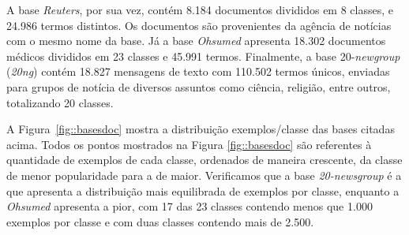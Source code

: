 A base \textit{Reuters}, por sua vez, contém 8.184 documentos divididos em 8 classes, e 24.986 termos distintos. Os documentos são provenientes da agência de notícias com o mesmo nome da base.
Já a base \textit{Ohsumed} apresenta 18.302 documentos médicos divididos em 23 classes e 45.991 termos.
Finalmente, a base 20-\textit{newgroup} (\textit{20ng}) contém 18.827 mensagens de texto com 110.502 termos únicos, enviadas para grupos de notícia de diversos assuntos como ciência, religião, entre outros, totalizando 20 classes.

A Figura~\ref{fig::basesdoc} mostra a distribuição exemplos/classe das bases citadas acima.
Todos os pontos mostrados na Figura \ref{fig::basesdoc} são referentes à quantidade de exemplos de cada classe, ordenados de maneira crescente, da classe de menor popularidade para a de maior. Verificamos que a base \textit{20-newsgroup} é a que apresenta a distribuição mais equilibrada de exemplos por classe, enquanto a \textit{Ohsumed} apresenta a pior, com 17 das 23 classes contendo menos que 1.000 exemplos por classe e com duas classes contendo mais de 2.500.

